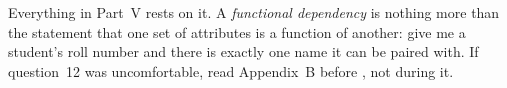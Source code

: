 \begin{conceptbox}
Everything in Part~V rests on it. A \emph{functional dependency} is nothing
more than the statement that one set of attributes is a function of another:
give me a student's roll number and there is exactly one name it can be paired
with. If question~12 was uncomfortable, read Appendix~B before ,
not during it.
\end{conceptbox}

\newpage
\tableofcontents
\newpage
\listoffigures
\newpage

